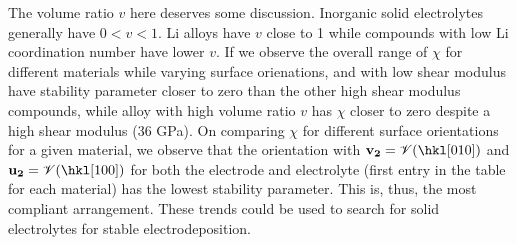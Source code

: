 \documentclass[%
reprint,
 amsmath,amssymb,
 aps,
 prb,
]{revtex4-1}
\newcommand{\vv}[1]{{\textbf{\textcolor{red}{Venkat: #1}}}}
\newcommand*{\rtvec}[1]{\mathbf{#1}}
\begin{document}
\begin{table}[htbp]

\end{table}

The volume ratio $v$ here deserves some discussion. Inorganic solid electrolytes generally have $0<v<1$. Li alloys have $v$ close to 1 while compounds with low Li coordination number have lower $v$. If we observe the overall range of $\chi$ for different materials while varying surface orienations,  and  with low shear modulus have stability parameter closer to zero than the other high shear modulus compounds, while alloy  with high volume ratio $v$ has $\chi$ closer to zero despite a high shear modulus (36 GPa). On comparing $\chi$ for different surface orientations for a given material, we observe that the orientation with $\rtvec{v_2}=\mathscr{V}(\hkl[0 1 0])$ and $\rtvec{u_2}=\mathscr{V}(\hkl[1 0 0])$  for  both the electrode and electrolyte (first entry in the table for each material) has the lowest stability parameter. This is, thus, the most compliant arrangement. These trends could be used to search for solid electrolytes for stable electrodeposition.
\end{document}

